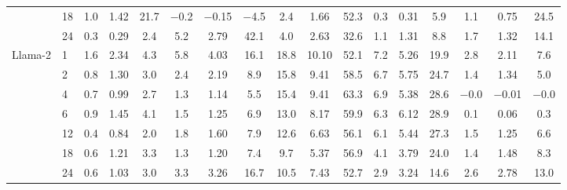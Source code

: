 \begin{table}[htbp]
{\begin{adjustbox}{max width=\linewidth, max totalheight=0.28\textheight}
\begin{tabular}{llccccccccccccccc}
 & 18 & 1.0 & 1.42 & 21.7 & $-$0.2 & $-$0.15 & \phantom{0}$-$4.5 & \phantom{0}2.4 & \phantom{0}1.66 & 52.3 & 0.3 & 0.31 & \phantom{0}5.9 & \phantom{$-$}1.1 & \phantom{$-$}0.75 & \phantom{$-$}24.5 \\
 & 24 & 0.3 & 0.29 & \phantom{0}2.4 & \phantom{$-$}5.2 & \phantom{$-$}2.79 & \phantom{$-$}42.1 & \phantom{0}4.0 & \phantom{0}2.63 & 32.6 & 1.1 & 1.31 & \phantom{0}8.8 & \phantom{$-$}1.7 & \phantom{$-$}1.32 & \phantom{$-$}14.1 \\
\midrule
Llama-2 & 1 & 1.6 & 2.34 & \phantom{0}4.3 & \phantom{$-$}5.8 & \phantom{$-$}4.03 & \phantom{$-$}16.1 & 18.8 & 10.10 & 52.1 & 7.2 & 5.26 & 19.9 & \phantom{$-$}2.8 & \phantom{$-$}2.11 & \phantom{$-$0}7.6 \\
 & 2 & 0.8 & 1.30 & \phantom{0}3.0 & \phantom{$-$}2.4 & \phantom{$-$}2.19 & \phantom{$-$0}8.9 & 15.8 & \phantom{0}9.41 & 58.5 & 6.7 & 5.75 & 24.7 & \phantom{$-$}1.4 & \phantom{$-$}1.34 & \phantom{$-$0}5.0 \\
 & 4 & 0.7 & 0.99 & \phantom{0}2.7 & \phantom{$-$}1.3 & \phantom{$-$}1.14 & \phantom{$-$0}5.5 & 15.4 & \phantom{0}9.41 & 63.3 & 6.9 & 5.38 & 28.6 & $-$0.0 & $-$0.01 & \phantom{0}$-$0.0 \\
 & 6 & 0.9 & 1.45 & \phantom{0}4.1 & \phantom{$-$}1.5 & \phantom{$-$}1.25 & \phantom{$-$0}6.9 & 13.0 & \phantom{0}8.17 & 59.9 & 6.3 & 6.12 & 28.9 & \phantom{$-$}0.1 & \phantom{$-$}0.06 & \phantom{$-$0}0.3 \\
 & 12 & 0.4 & 0.84 & \phantom{0}2.0 & \phantom{$-$}1.8 & \phantom{$-$}1.60 & \phantom{$-$0}7.9 & 12.6 & \phantom{0}6.63 & 56.1 & 6.1 & 5.44 & 27.3 & \phantom{$-$}1.5 & \phantom{$-$}1.25 & \phantom{$-$0}6.6 \\
 & 18 & 0.6 & 1.21 & \phantom{0}3.3 & \phantom{$-$}1.3 & \phantom{$-$}1.20 & \phantom{$-$0}7.4 & \phantom{0}9.7 & \phantom{0}5.37 & 56.9 & 4.1 & 3.79 & 24.0 & \phantom{$-$}1.4 & \phantom{$-$}1.48 & \phantom{$-$0}8.3 \\
 & 24 & 0.6 & 1.03 & \phantom{0}3.0 & \phantom{$-$}3.3 & \phantom{$-$}3.26 & \phantom{$-$}16.7 & 10.5 & \phantom{0}7.43 & 52.7 & 2.9 & 3.24 & 14.6 & \phantom{$-$}2.6 & \phantom{$-$}2.78 & \phantom{$-$}13.0 \\
\bottomrule
\end{tabular}
\end{adjustbox}
}
\end{table}

